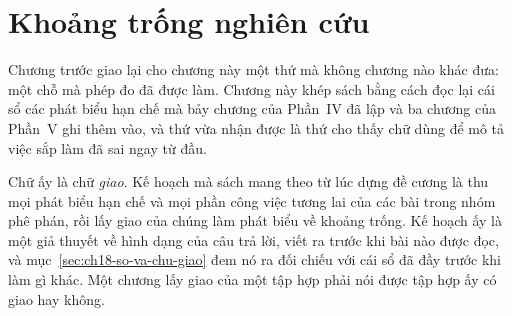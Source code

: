 %
%
%
%
\chapter{Khoảng trống nghiên cứu}
\label{ch:khoang-trong-nghien-cuu}

Chương trước giao lại cho chương này một thứ mà không chương nào khác đưa: một
chỗ mà phép đo đã được làm. Chương này khép sách bằng cách đọc lại cái sổ các
phát biểu hạn chế mà bảy chương của Phần~IV đã lập và ba chương của Phần~V ghi
thêm vào, và thứ vừa nhận được là thứ cho thấy chữ dùng để mô tả việc sắp làm đã
sai ngay từ đầu.

%
Chữ ấy là chữ \emph{giao}. Kế hoạch mà sách mang theo từ lúc dựng đề cương là thu
mọi phát biểu hạn chế và mọi phần công việc tương lai của các bài trong nhóm phê
phán, rồi lấy giao của chúng làm phát biểu về khoảng trống. Kế hoạch ấy là một
giả thuyết về hình dạng của câu trả lời, viết ra trước khi bài nào được đọc, và
mục~\ref{sec:ch18-so-va-chu-giao} đem nó ra đối chiếu với cái sổ đã đầy trước khi
làm gì khác. Một chương lấy giao của một tập hợp phải nói được tập hợp ấy có giao
hay không.

